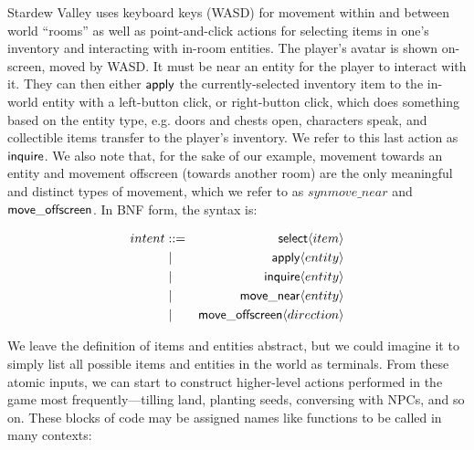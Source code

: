 Stardew Valley uses keyboard keys (WASD) for movement within and between
world ``rooms'' as well as point-and-click actions for selecting items in
one's inventory and interacting with in-room entities. The player's avatar
is shown on-screen, moved by WASD. It must be near an entity for the player
to interact with it. They can then either $\mathsf{apply}$ the
currently-selected inventory item to the in-world entity with a left-button
click, or right-button click, which does something based on the entity
type, e.g. doors and chests open, characters speak, and collectible items
transfer to the player's inventory. We refer to this last action as
$\mathsf{inquire}$. We also note that, for the sake of our example, 
movement towards an entity and movement offscreen (towards another room)
are the only meaningful and distinct types of movement, which we refer to
as $syn{move\_near}$ and $\mathsf{move\_offscreen}$. In BNF form, the syntax
is:


\begin{eqnarray*}
intent &::=& \mathsf{select} \langle item \rangle\\
       &\mid& \mathsf{apply} \langle entity \rangle\\
       &\mid& \mathsf{inquire} \langle entity \rangle\\
       &\mid& \mathsf{move\_near} \langle entity \rangle\\
       &\mid& \mathsf{move\_offscreen} \langle direction \rangle
\end{eqnarray*}

We leave the definition of items and entities abstract, but we could
imagine it to simply list all possible items and entities in the world as
terminals.
From these atomic inputs, we can start to construct higher-level actions
performed in the game most frequently---tilling land,
planting seeds, conversing with NPCs, and so on. These blocks of code may
be assigned names like functions to be called in many contexts:

% 

